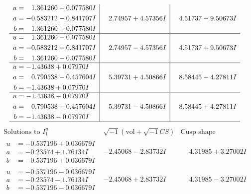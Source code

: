 \documentclass[1p]{elsarticle_modified}
\theoremstyle{definition}
\newcommand{\I}{\sqrt{-1}}
\begin{document}
$$\begin{array}{c|c|c}
\begin{aligned}
u &= \phantom{-}1.361260 + 0.077580 I \\
a &= -0.583212 - 0.841707 I \\
b &= \phantom{-}1.361260 + 0.077580 I\end{aligned}
 & \phantom{-}2.74957 + 4.57356 I & \phantom{-}4.51737 - 9.50673 I \\ \hline\begin{aligned}
u &= \phantom{-}1.361260 - 0.077580 I \\
a &= -0.583212 + 0.841707 I \\
b &= \phantom{-}1.361260 - 0.077580 I\end{aligned}
 & \phantom{-}2.74957 - 4.57356 I & \phantom{-}4.51737 + 9.50673 I \\ \hline\begin{aligned}
u &= -1.43638 + 0.07970 I \\
a &= \phantom{-}0.790538 - 0.457604 I \\
b &= -1.43638 + 0.07970 I\end{aligned}
 & \phantom{-}5.39731 + 4.50866 I & \phantom{-}8.58445 - 4.27811 I \\ \hline\begin{aligned}
u &= -1.43638 - 0.07970 I \\
a &= \phantom{-}0.790538 + 0.457604 I \\
b &= -1.43638 - 0.07970 I\end{aligned}
 & \phantom{-}5.39731 - 4.50866 I & \phantom{-}8.58445 + 4.27811 I\\
 \hline 
 \end{array}$$\newpage$$\begin{array}{c|c|c}  
\text{Solutions to }I^u_{1}& \I (\text{vol} + \sqrt{-1}CS) & \text{Cusp shape}\\
 \hline 
\begin{aligned}
u &= -0.537196 + 0.036679 I \\
a &= -0.23574 + 1.76134 I \\
b &= -0.537196 + 0.036679 I\end{aligned}
 & -2.45068 - 2.83732 I & \phantom{-}4.31985 + 3.27002 I \\ \hline\begin{aligned}
u &= -0.537196 - 0.036679 I \\
a &= -0.23574 - 1.76134 I \\
b &= -0.537196 - 0.036679 I\end{aligned}
 & -2.45068 + 2.83732 I & \phantom{-}4.31985 - 3.27002 I \\ \hline\begin{aligned}

\end{aligned}
\end{array}$$
\end{document}
